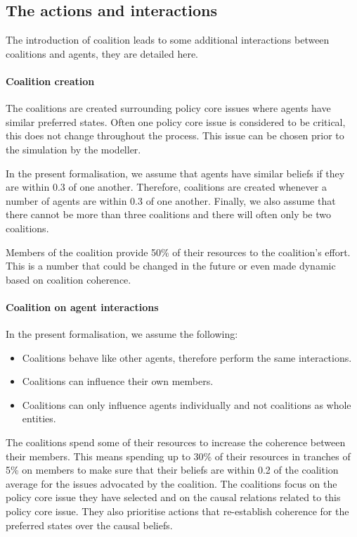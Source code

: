 \documentclass[11pt]{article}
\begin{document}
\subsection{The actions and interactions}


The introduction of coalition leads to some additional interactions between coalitions and agents, they are detailed here.

\paragraph{Coalition creation}

The coalitions are created surrounding policy core issues where agents have similar preferred states. Often one policy core issue is considered to be critical, this does not change throughout the process. This issue can be chosen prior to the simulation by the modeller.

In the present formalisation, we assume that agents have similar beliefs if they are within 0.3 of one another. Therefore, coalitions are created whenever a number of agents are within 0.3 of one another. Finally, we also assume that there cannot be more than three coalitions and there will often only be two coalitions.

Members of the coalition provide 50\% of their resources to the coalition's effort. This is a number that could be changed in the future or even made dynamic based on coalition coherence.


\paragraph{Coalition on agent interactions}

In the present formalisation, we assume the following:

\begin{itemize}
\item Coalitions behave like other agents, therefore perform the same interactions.
\item Coalitions can influence their own members.
\item Coalitions can only influence agents individually and not coalitions as whole entities.
\end{itemize}

The coalitions spend some of their resources to increase the coherence between their members. This means spending up to 30\% of their resources in tranches of 5\% on members to make sure that their beliefs are within 0.2 of the coalition average for the issues advocated by the coalition. The coalitions focus on the policy core issue they have selected and on the causal relations related to this policy core issue. They also prioritise actions that re-establish coherence for the preferred states over the causal beliefs.
\end{document}
